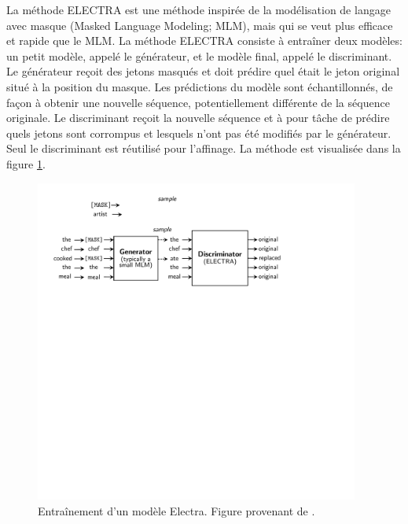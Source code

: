 \documentclass[12pt,twoside,maitrise]{dms}
\theoremstyle{definition}
\numberwithin{equation}{section}
\numberwithin{table}{chapter}
\numberwithin{figure}{chapter}
\begin{document}
La méthode ELECTRA\cite{clark2020electrapretrainingtextencoders} est une
méthode inspirée de la modélisation de langage avec masque (Masked Language
Modeling; MLM), mais qui se veut plus efficace et rapide que le MLM. La méthode
ELECTRA consiste à entraîner deux modèles: un petit modèle, appelé le
générateur, et le modèle final, appelé le discriminant. Le générateur reçoit
des jetons masqués et doit prédire quel était le jeton original situé à la
position du masque. Les prédictions du modèle sont échantillonnés, de façon à
obtenir une nouvelle séquence, potentiellement différente de la séquence
originale. Le discriminant reçoit la nouvelle séquence et à pour tâche de
prédire quels jetons sont corrompus et lesquels n'ont pas été modifiés par le
générateur. Seul le discriminant est réutilisé pour l'affinage. La méthode est
visualisée dans la figure \ref{fig:electra}.

\begin{figure}
    \begin{center}
        \includegraphics[width=0.95\textwidth]{figures/electra_entr.pdf}
    \end{center}
    \caption{Entraînement d'un modèle Electra. Figure provenant de \cite{clark2020electrapretrainingtextencoders}.}
    \label{fig:electra}
\end{figure}
\end{document}
